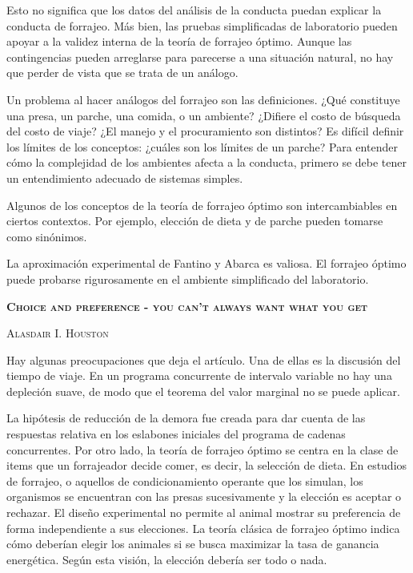 \documentclass[a4paper,12pt]{article}
\begin{document}
Esto no significa que los datos del análisis de la conducta puedan explicar la conducta de forrajeo. Más bien, las pruebas simplificadas de laboratorio pueden apoyar a la validez interna de la teoría de forrajeo óptimo. Aunque las contingencias pueden arreglarse para parecerse a una situación natural, no hay que perder de vista que se trata de un análogo.

Un problema al hacer análogos del forrajeo son las definiciones. ¿Qué constituye una presa, un parche, una comida, o un ambiente? ¿Difiere el costo de búsqueda del costo de viaje? ¿El manejo y el procuramiento son distintos? Es difícil definir los límites de los conceptos: ¿cuáles son los límites de un parche? Para entender cómo la complejidad de los ambientes afecta a la conducta, primero se debe tener un entendimiento adecuado de sistemas simples.

Algunos de los conceptos de la teoría de forrajeo óptimo son intercambiables en ciertos contextos. Por ejemplo, elección de dieta y de parche pueden tomarse como sinónimos. 

La aproximación experimental de Fantino y Abarca es valiosa. El forrajeo óptimo puede probarse rigurosamente en el ambiente simplificado del laboratorio.

{\scshape\bfseries Choice and preference - you can't always want what you get}

{\scshape Alasdair I. Houston}

Hay algunas preocupaciones que deja el artículo. Una de ellas es la discusión del tiempo de viaje. En un programa concurrente de intervalo variable no hay una depleción suave, de modo que el teorema del valor marginal no se puede aplicar.

La hipótesis de reducción de la demora fue creada para dar cuenta de las respuestas relativa en los eslabones iniciales del programa de cadenas concurrentes. Por otro lado, la teoría de forrajeo óptimo se centra  en la clase de items que un forrajeador decide comer, es decir, la selección de dieta. En estudios de forrajeo, o aquellos de condicionamiento operante que los simulan, los organismos se encuentran con las presas sucesivamente y la elección es aceptar o rechazar. El diseño experimental no permite al animal mostrar su preferencia de forma independiente a sus elecciones. La teoría clásica de forrajeo óptimo indica cómo deberían elegir los animales si se busca maximizar la tasa de ganancia energética. Según esta visión, la elección debería ser todo o nada.
\end{document}
